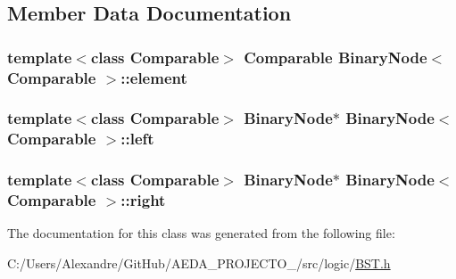 \subsection{Member Data Documentation}
\hypertarget{class_binary_node_a75804c1624577ae485b775408b54bd06}{}
\subsubsection[{element}]{\setlength{\rightskip}{0pt plus 5cm}template$<$class Comparable$>$ Comparable {\bf Binary\+Node}$<$ Comparable $>$\+::element\hspace{0.3cm}{\ttfamily [private]}}\label{class_binary_node_a75804c1624577ae485b775408b54bd06}
\hypertarget{class_binary_node_a2b6352b5519f90f2d9c2d610b2278dac}{}
\subsubsection[{left}]{\setlength{\rightskip}{0pt plus 5cm}template$<$class Comparable$>$ {\bf Binary\+Node}$\ast$ {\bf Binary\+Node}$<$ Comparable $>$\+::left\hspace{0.3cm}{\ttfamily [private]}}\label{class_binary_node_a2b6352b5519f90f2d9c2d610b2278dac}
\hypertarget{class_binary_node_a847342c242923f34b77fc5e402fbbb4b}{}
\subsubsection[{right}]{\setlength{\rightskip}{0pt plus 5cm}template$<$class Comparable$>$ {\bf Binary\+Node}$\ast$ {\bf Binary\+Node}$<$ Comparable $>$\+::right\hspace{0.3cm}{\ttfamily [private]}}\label{class_binary_node_a847342c242923f34b77fc5e402fbbb4b}


The documentation for this class was generated from the following file\+:\begin{DoxyCompactItemize}
\item 
C\+:/\+Users/\+Alexandre/\+Git\+Hub/\+A\+E\+D\+A\+\_\+\+P\+R\+O\+J\+E\+C\+T\+O\+\_/src/logic/\hyperlink{_b_s_t_8h}{B\+S\+T.\+h}\end{DoxyCompactItemize}
